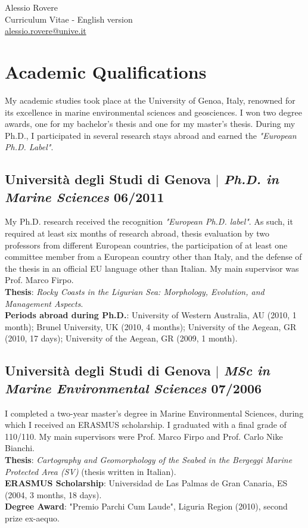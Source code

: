 \documentclass[11pt]{article}
\begin{document}
\newpage
\begin{center}
    {\fontsize{36}{36}\selectfont\interthin Alessio \interheavy Rovere} \\ \bigskip
    {\fontsize{14}{14}\selectfont\interthin Curriculum Vitae - English version}\\ \bigskip
    {\color{icnclr}\faEnvelope[regular]} \href{mailto:alessio.rovere@unive.it}{alessio.rovere@unive.it}
\end{center}

\section{Academic Qualifications}
{\normalfont My academic studies took place at the University of Genoa, Italy, renowned for its excellence in marine environmental sciences and geosciences. I won two degree awards, one for my bachelor's thesis and one for my master's thesis. During my Ph.D., I participated in several research stays abroad and earned the \textit{"European Ph.D. Label"}.} \\
\bigskip
\subsection{Università degli Studi di Genova $|$ {\normalfont\textit{Ph.D. in Marine Sciences}} \hfill 06/2011}
{\footnotesize My Ph.D. research received the recognition \textit{"European Ph.D. label"}. As such, it required at least six months of research abroad, thesis evaluation by two professors from different European countries, the participation of at least one committee member from a European country other than Italy, and the defense of the thesis in an official EU language other than Italian. My main supervisor was Prof. Marco Firpo. \\
\textbf{Thesis}: \textit{Rocky Coasts in the Ligurian Sea: Morphology, Evolution, and Management Aspects}.\\ 
\textbf{Periods abroad during Ph.D.}: University of Western Australia, AU (2010, 1 month); Brunel University, UK (2010, 4 months); University of the Aegean, GR (2010, 17 days); University of the Aegean, GR (2009, 1 month).}
\bigskip

\subsection{Università degli Studi di Genova $|$ {\normalfont\textit{MSc in Marine Environmental Sciences}} \hfill 07/2006}
{\footnotesize I completed a two-year master's degree in Marine Environmental Sciences, during which I received an ERASMUS scholarship. I graduated with a final grade of 110/110. My main supervisors were Prof. Marco Firpo and Prof. Carlo Nike Bianchi. \\
\textbf{Thesis}: \textit{Cartography and Geomorphology of the Seabed in the Bergeggi Marine Protected Area (SV)} (thesis written in Italian).\\
\textbf{ERASMUS Scholarship}: Universidad de Las Palmas de Gran Canaria, ES (2004, 3 months, 18 days).\\
\textbf{Degree Award}: "Premio Parchi Cum Laude", Liguria Region (2010), second prize ex-aequo.}
\bigskip
\end{document}
